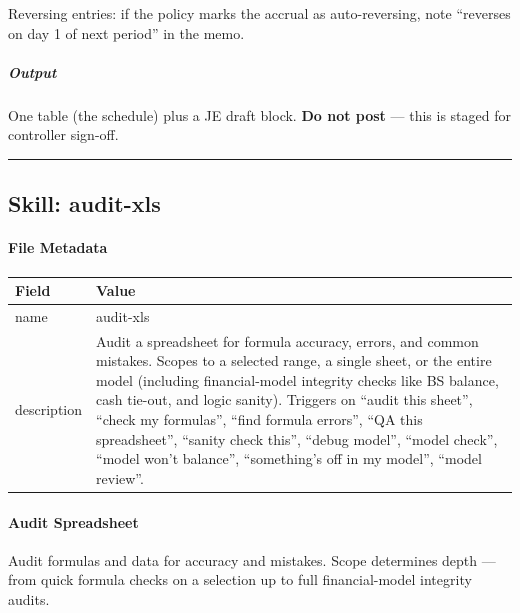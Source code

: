 \documentclass[11pt]{article}
\begin{document}
Reversing entries: if the policy marks the accrual as auto-reversing, note ``reverses on day 1 of next period'' in the memo.


\subparagraph{Output}\mbox{}\par

One table (the schedule) plus a JE draft block. \textbf{Do not post} — this is staged for controller sign-off.


\vspace{0.8em}\hrule\vspace{0.8em}

\subsection{Skill: audit-xls}\label{file:month-end-closer-skills-audit-xls-SKILL-md}

\paragraph{File Metadata}\mbox{}\par
\begingroup
\small
\setlength{\tabcolsep}{2pt}
\begin{longtable}{>{\RaggedRight\arraybackslash\hspace{0pt}}p{}>{\RaggedRight\arraybackslash\hspace{0pt}}p{}}
\toprule
{} \textbf{Field} & \textbf{Value} \\
\midrule
{} name & audit-xls \\
{} description & Audit a spreadsheet for formula accuracy, errors, and common mistakes. Scopes to a selected range, a single sheet, or the entire model (including financial-model integrity checks like BS balance, cash tie-out, and logic sanity). Triggers on ``audit this sheet'', ``check my formulas'', ``find formula errors'', ``QA this spreadsheet'', ``sanity check this'', ``debug model'', ``model check'', ``model won't balance'', ``something's off in my model'', ``model review''. \\
\bottomrule
\end{longtable}
\endgroup


\paragraph{Audit Spreadsheet}\mbox{}\par

Audit formulas and data for accuracy and mistakes. Scope determines depth — from quick formula checks on a selection up to full financial-model integrity audits.
\end{document}
